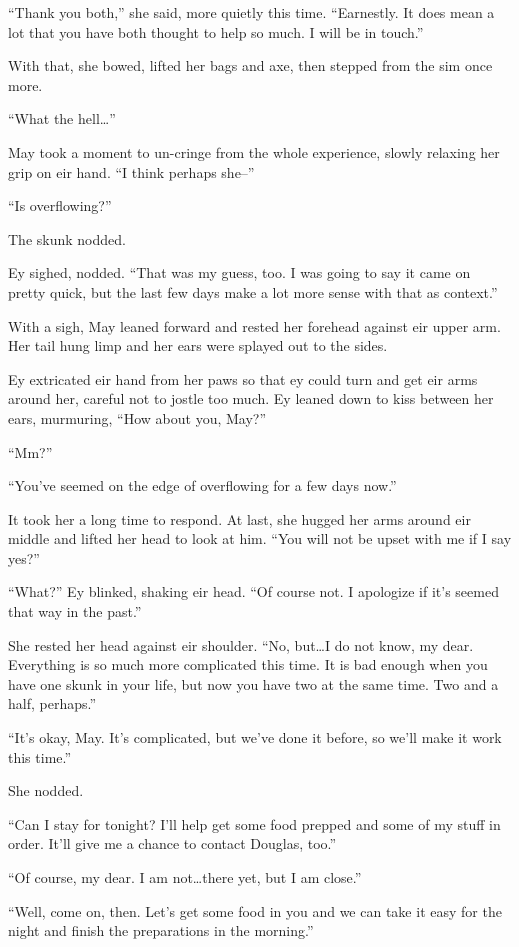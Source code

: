 ``Thank you both,'' she said, more quietly this time. ``Earnestly. It does mean a lot that you have both thought to help so much. I will be in touch.''

With that, she bowed, lifted her bags and axe, then stepped from the sim once more.

``What the hell\ldots{}''

May took a moment to un-cringe from the whole experience, slowly relaxing her grip on eir hand. ``I think perhaps she--''

``Is overflowing?''

The skunk nodded.

Ey sighed, nodded. ``That was my guess, too. I was going to say it came on pretty quick, but the last few days make a lot more sense with that as context.''

With a sigh, May leaned forward and rested her forehead against eir upper arm. Her tail hung limp and her ears were splayed out to the sides.

Ey extricated eir hand from her paws so that ey could turn and get eir arms around her, careful not to jostle too much. Ey leaned down to kiss between her ears, murmuring, ``How about you, May?''

``Mm?''

``You've seemed on the edge of overflowing for a few days now.''

It took her a long time to respond. At last, she hugged her arms around eir middle and lifted her head to look at him. ``You will not be upset with me if I say yes?''

``What?'' Ey blinked, shaking eir head. ``Of course not. I apologize if it's seemed that way in the past.''

She rested her head against eir shoulder. ``No, but\ldots I do not know, my dear. Everything is so much more complicated this time. It is bad enough when you have one skunk in your life, but now you have two at the same time. Two and a half, perhaps.''

``It's okay, May. It's complicated, but we've done it before, so we'll make it work this time.''

She nodded.

``Can I stay for tonight? I'll help get some food prepped and some of my stuff in order. It'll give me a chance to contact Douglas, too.''

``Of course, my dear. I am not\ldots there yet, but I am close.''

``Well, come on, then. Let's get some food in you and we can take it easy for the night and finish the preparations in the morning.''

